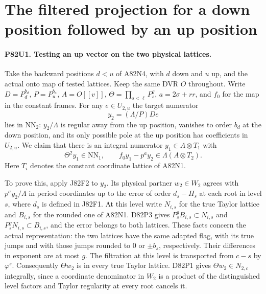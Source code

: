 \section{The filtered projection for a down position followed by an up position}

\paragraph{P82U1. Testing an up vector on the two physical lattices.}
Take the backward positions $d<u$ of A82N4, with $d$ down and
$u$ up, and the actual onto map of tested lattices. Keep the same
DVR $O$ throughout. Write $D=P_d^{b_d}$, $P=P_u^{b_u}$,
$A=O[[v]]$, $\Theta=\prod_{s<\ell}P_s^g$, $a=2\sigma+rr$,
and $f_0$ for the map in the constant frames. For any
$e\in U_{2,u}$ the target numerator
\[
                    y_2=(\Lambda/P)D e
\]
lies in $\mathrm{NN}_2$: $y_2/\Lambda$ is regular away from
the up position, vanishes to order $b_d$ at the down position,
and its only possible pole at the up position has coefficients
in $U_{2,u}$. We claim that there is an integral numerator
$y_1\in A\otimes T_1$ with
\[
 \Theta^2 y_1\in\mathrm{NN}_1,\qquad
   f_0 y_1-p^a y_2\in \Lambda(A\otimes T_2).
\]
Here $T_i$ denotes the constant coordinate lattice of A82N1.

To prove this, apply J82F2 to $y_2$. Its physical partner
$w_2\in W_2$ agrees with $p^\sigma y_2/\Lambda$ in period
coordinates up to the error of order $d_s-H_s$ at each root
in level $s$, where $d_s$ is defined in J82F1. At this level
write $N_{i,s}$ for the true Taylor lattice and $B_{i,s}$ for
the rounded one of A82N1. D82P3 gives
$P_s^gB_{i,s}\subset N_{i,s}$ and
$P_s^gN_{i,s}\subset B_{i,s}$, and the error belongs to
both lattices. These facts concern the actual representation:
the two lattices have the same adapted flag, with its true jumps
and with those jumps rounded to $0$ or $\pm b_s$, respectively.
Their differences in exponent are at most $g$. The filtration
at this level is transported from $c-s$ by $\varphi^s$.
Consequently $\Theta w_2$ is in every true Taylor lattice.
D82P1 gives $\Theta w_2\in N_{2,c}$ integrally, since a
coordinate denominator in $W_2$ is a product of the distinguished
level factors and Taylor regularity at every root cancels it.

